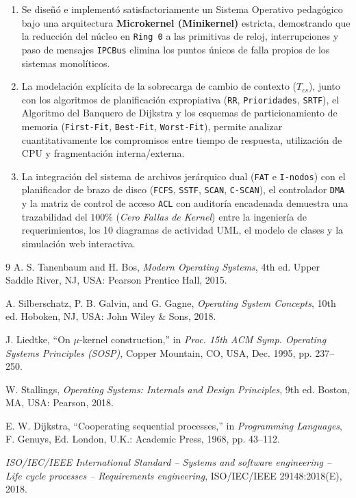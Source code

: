 \documentclass[10pt,twocolumn,letterpaper]{article}
\begin{document}
\begin{enumerate}[leftmargin=*,nosep]
  \item Se dise\~n\'o e implement\'o satisfactoriamente un Sistema Operativo pedag\'ogico bajo una arquitectura \textbf{Microkernel (Minikernel)} estricta, demostrando que la reducci\'on del n\'ucleo en \texttt{Ring 0} a las primitivas de reloj, interrupciones y paso de mensajes \texttt{IPCBus} elimina los puntos \'unicos de falla propios de los sistemas monol\'iticos.
  \item La modelaci\'on expl\'icita de la sobrecarga de cambio de contexto ($T_{cs}$), junto con los algoritmos de planificaci\'on expropiativa (\texttt{RR}, \texttt{Prioridades}, \texttt{SRTF}), el Algoritmo del Banquero de Dijkstra y los esquemas de particionamiento de memoria (\texttt{First-Fit}, \texttt{Best-Fit}, \texttt{Worst-Fit}), permite analizar cuantitativamente los compromisos entre tiempo de respuesta, utilizaci\'on de CPU y fragmentaci\'on interna/externa.
  \item La integraci\'on del sistema de archivos jer\'arquico dual (\texttt{FAT} e \texttt{I-nodos}) con el planificador de brazo de disco (\texttt{FCFS}, \texttt{SSTF}, \texttt{SCAN}, \texttt{C-SCAN}), el controlador \texttt{DMA} y la matriz de control de acceso \texttt{ACL} con auditor\'ia encadenada demuestra una trazabilidad del $100\%$ (\textit{Cero Fallas de Kernel}) entre la ingenier\'ia de requerimientos, los 10 diagramas de actividad UML, el modelo de clases y la simulaci\'on web interactiva.
\end{enumerate}

\begin{thebibliography}{9}
\scriptsize
{}
A. S. Tanenbaum and H. Bos, \emph{Modern Operating Systems}, 4th ed. Upper Saddle River, NJ, USA: Pearson Prentice Hall, 2015.

A. Silberschatz, P. B. Galvin, and G. Gagne, \emph{Operating System Concepts}, 10th ed. Hoboken, NJ, USA: John Wiley \& Sons, 2018.

J. Liedtke, ``On $\mu$-kernel construction,'' in \emph{Proc. 15th ACM Symp. Operating Systems Principles (SOSP)}, Copper Mountain, CO, USA, Dec. 1995, pp. 237--250.

W. Stallings, \emph{Operating Systems: Internals and Design Principles}, 9th ed. Boston, MA, USA: Pearson, 2018.

E. W. Dijkstra, ``Cooperating sequential processes,'' in \emph{Programming Languages}, F. Genuys, Ed. London, U.K.: Academic Press, 1968, pp. 43--112.

\emph{ISO/IEC/IEEE International Standard -- Systems and software engineering -- Life cycle processes -- Requirements engineering}, ISO/IEC/IEEE 29148:2018(E), 2018.
\end{thebibliography}
\end{document}
